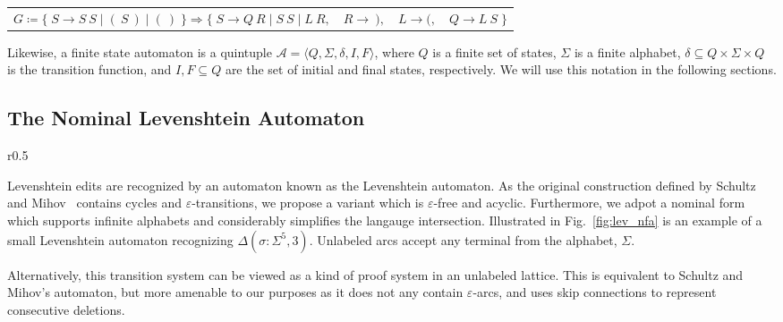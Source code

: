 \documentclass[sigplan,review,anonymous,acmsmall]{acmart}\settopmatter{printfolios=false,printccs=false,printacmref=false}
\begin{document}
  \begin{table}[H]
    \begin{tabular}{llll}
      $G\coloneqq\big\{\;S \rightarrow S\:S \mid (\:S\:) \mid (\:)\;\big\} \Longrightarrow \big\{\;S\rightarrow Q\:R \mid S\:S \mid L\:R,$ & $R \rightarrow\:),$ & $L \rightarrow (,$ & $Q\rightarrow L\:S\;\big\}$
    \end{tabular}
  \end{table}\vspace{-8pt}

  Likewise, a finite state automaton is a quintuple $\mathcal{A} = \langle Q, \Sigma, \delta, I, F\rangle$, where $Q$ is a finite set of states, $\Sigma$ is a finite alphabet, $\delta \subseteq Q \times \Sigma \times Q$ is the transition function, and $I, F \subseteq Q$ are the set of initial and final states, respectively. We will use this notation in the following sections.

  \pagebreak\subsection{The Nominal Levenshtein Automaton}\label{sec:lev_nfa}

  \begin{wrapfigure}{r}{0.5\textwidth}
    \vspace{-0.3cm}
    \begin{center}
      
    \end{center}
    \caption{NFA recognizing Levenshtein $\Delta(\sigma: \Sigma^5, 3)$.}\label{fig:lev_nfa}
    \vspace{-0.5cm}
  \end{wrapfigure}

  Levenshtein edits are recognized by an automaton known as the Levenshtein automaton. As the original construction defined by Schultz and Mihov~\cite{schulz2002fast} contains cycles and $\varepsilon$-transitions, we propose a variant which is $\varepsilon$-free and acyclic. Furthermore, we adpot a nominal form which supports infinite alphabets and considerably simplifies the langauge intersection. Illustrated in Fig.~\ref{fig:lev_nfa} is an example of a small Levenshtein automaton recognizing $\Delta(\sigma: \Sigma^5, 3)$. Unlabeled arcs accept any terminal from the alphabet, $\Sigma$.

  \noindent Alternatively, this transition system can be viewed as a kind of proof system in an unlabeled lattice. This is equivalent to Schultz and Mihov's automaton, but more amenable to our purposes as it does not any contain $\varepsilon$-arcs, and uses skip connections to represent consecutive deletions.
\end{document}
